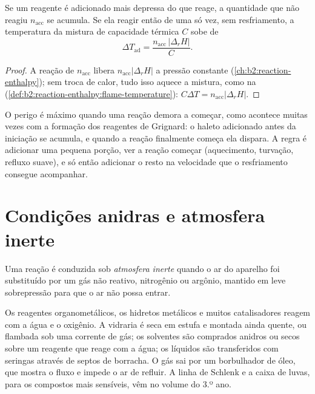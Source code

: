 \begin{proposition}[Acúmulo]\label{prop:b2:lab-techniques-2:accumulation}
Se um reagente é adicionado mais depressa do que reage, a quantidade que não reagiu $n_{\mathrm{acc}}$ se
acumula. Se ela reagir então de uma só vez, sem resfriamento, a temperatura da mistura de capacidade
térmica $C$ sobe de
\begin{equation*}
\Delta T_{\mathrm{ad}} = \frac{n_{\mathrm{acc}}\,|\Delta_rH|}{C}.
\end{equation*}
\end{proposition}

\begin{proof}
A reação de $n_{\mathrm{acc}}$ libera $n_{\mathrm{acc}}|\Delta_rH|$ a pressão constante
(\cref{ch:b2:reaction-enthalpy}); sem troca de calor, tudo isso aquece a mistura, como na  (\cref{def:b2:reaction-enthalpy:flame-temperature}): $C\Delta T =
n_{\mathrm{acc}}|\Delta_rH|$.
\end{proof}

O perigo é máximo quando uma reação demora a começar, como acontece muitas vezes com a formação dos
reagentes de Grignard: o haleto adicionado antes da iniciação se acumula, e quando a reação finalmente
começa ela dispara. A regra é adicionar uma pequena porção, ver a reação começar (aquecimento, turvação,
refluxo suave), e só então adicionar o resto na velocidade que o resfriamento consegue acompanhar.

\section{Condições anidras e atmosfera inerte}

\begin{definition}\label{def:b2:lab-techniques-2:inert}
Uma reação é conduzida sob \emph{atmosfera inerte} quando o ar do aparelho foi
substituído por um gás não reativo, nitrogênio ou argônio, mantido em leve sobrepressão para que o ar não
possa entrar.
\end{definition}

Os reagentes organometálicos, os hidretos metálicos e muitos catalisadores reagem com a água e o
oxigênio. A vidraria é seca em estufa e montada ainda quente, ou flambada sob uma corrente de gás; os
solventes são comprados anidros ou secos sobre um reagente que reage com a água; os líquidos são
transferidos com seringas através de septos de borracha. O gás sai por um borbulhador de óleo, que
mostra o fluxo e impede o ar de refluir. A linha de Schlenk e a caixa de luvas, para os compostos mais
sensíveis, vêm no volume do 3.º ano.

